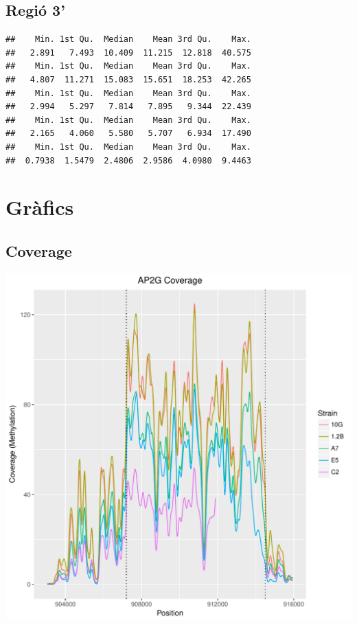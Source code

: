 \documentclass{article}\usepackage[]{graphicx}\usepackage[]{color}
\makeatletter
\newenvironment{kframe}{%
 \def\at@end@of@kframe{}%
 \ifinner\ifhmode%
  \def\at@end@of@kframe{\end{minipage}}%
  \begin{minipage}{\columnwidth}%
 \fi\fi%
 \def\FrameCommand##1{\hskip\@totalleftmargin \hskip-\fboxsep
 \colorbox{shadecolor}{##1}\hskip-\fboxsep
     \hskip-\linewidth \hskip-\@totalleftmargin \hskip\columnwidth}%
 \MakeFramed {\advance\hsize-\width
   \@totalleftmargin\z@ \linewidth\hsize
   \@setminipage}}%
 {\par\unskip\endMakeFramed%
 \at@end@of@kframe}
\newenvironment{knitrout}{}{} %
\makeatother
\begin{document}
\subsection{Regió 3'}
\begin{knitrout}
\color{fgcolor}\begin{kframe}
\begin{verbatim}
##    Min. 1st Qu.  Median    Mean 3rd Qu.    Max. 
##   2.891   7.493  10.409  11.215  12.818  40.575 
##    Min. 1st Qu.  Median    Mean 3rd Qu.    Max. 
##   4.807  11.271  15.083  15.651  18.253  42.265 
##    Min. 1st Qu.  Median    Mean 3rd Qu.    Max. 
##   2.994   5.297   7.814   7.895   9.344  22.439 
##    Min. 1st Qu.  Median    Mean 3rd Qu.    Max. 
##   2.165   4.060   5.580   5.707   6.934  17.490 
##    Min. 1st Qu.  Median    Mean 3rd Qu.    Max. 
##  0.7938  1.5479  2.4806  2.9586  4.0980  9.4463
\end{verbatim}
\end{kframe}
\end{knitrout}
\clearpage


\section{Gràfics}
\subsection{Coverage}
\begin{knitrout}
\color{fgcolor}
\includegraphics[width=1\linewidth]{figure/plot_coverage-1} 

\end{knitrout}
\clearpage
\end{document}
